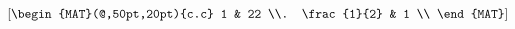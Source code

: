 \[ \left[
   \begin{MAT}(@,50pt,20pt){c.c}
      1 & 22 \\.
      \frac{1}{2} & 1 \\
   \end{MAT}
\right] \]

